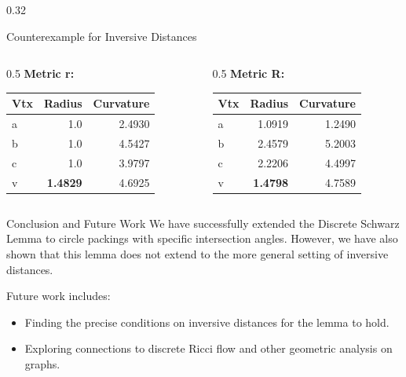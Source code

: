 \documentclass[final]{beamer}
\begin{document}
\begin{frame}[t]
\begin{columns}[T]
\begin{column}{0.32\linewidth}
\begin{alertblock}{Counterexample for Inversive Distances}
                \begin{columns}[T]
                    \begin{column}{0.5\linewidth}
                        \textbf{Metric r:}
                        \tiny
                        \begin{tabular}{lrr}
                        \toprule
                        Vtx & Radius & Curvature \\
                        \midrule
                        a & 1.0 & 2.4930 \\
                        b & 1.0 & 4.5427 \\
                        c & 1.0 & 3.9797 \\
                        v & \textbf{1.4829} & 4.6925 \\
                        \bottomrule
                        \end{tabular}
                    \end{column}
                    \begin{column}{0.5\linewidth}
                        \textbf{Metric R:}
                        \tiny
                        \begin{tabular}{lrr}
                        \toprule
                        Vtx & Radius & Curvature \\
                        \midrule
                        a & 1.0919 & 1.2490 \\
                        b & 2.4579 & 5.2003 \\
                        c & 2.2206 & 4.4997 \\
                        v & \textbf{1.4798} & 4.7589 \\
                        \bottomrule
                        \end{tabular}
                    \end{column}
                \end{columns}
            \end{alertblock}

            \begin{block}{Conclusion and Future Work}
                We have successfully extended the Discrete Schwarz Lemma to circle packings with specific intersection angles. However, we have also shown that this lemma does not extend to the more general setting of inversive distances.

                Future work includes:
                \begin{itemize}
                    \item Finding the precise conditions on inversive distances for the lemma to hold.
                    \item Exploring connections to discrete Ricci flow and other geometric analysis on graphs.
                \end{itemize}
            \end{block}


\end{column}
\end{columns}
\end{frame}
\end{document}
